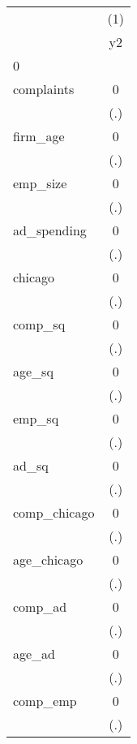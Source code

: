 {
\def\sym#1{\ifmmode^{#1}\else\(^{#1}\)\fi}
\begin{tabular}{l*{1}{c}}
\hline\hline
            &\multicolumn{1}{c}{(1)}\\
            &\multicolumn{1}{c}{y2}\\
\hline
0           &                     \\
complaints  &           0         \\
            &         (.)         \\
[1em]
firm\_age    &           0         \\
            &         (.)         \\
[1em]
emp\_size    &           0         \\
            &         (.)         \\
[1em]
ad\_spending &           0         \\
            &         (.)         \\
[1em]
chicago     &           0         \\
            &         (.)         \\
[1em]
comp\_sq     &           0         \\
            &         (.)         \\
[1em]
age\_sq      &           0         \\
            &         (.)         \\
[1em]
emp\_sq      &           0         \\
            &         (.)         \\
[1em]
ad\_sq       &           0         \\
            &         (.)         \\
[1em]
comp\_chicago&           0         \\
            &         (.)         \\
[1em]
age\_chicago &           0         \\
            &         (.)         \\
[1em]
comp\_ad     &           0         \\
            &         (.)         \\
[1em]
age\_ad      &           0         \\
            &         (.)         \\
[1em]
comp\_emp    &           0         \\
            &         (.)         \\

\end{tabular}}
